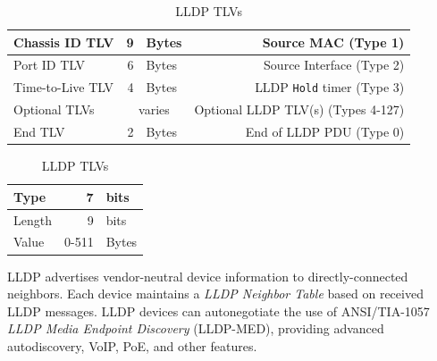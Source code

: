 \documentclass[12pt]{article}
\newcommand{\mc}[3]{\multicolumn{#1}{#2}{#3}}
\begin{document}
	\begin{table}[H]
	\begin{minipage}{.75\linewidth}
	\centering
	\caption{IEEE 802.1AB LLDP PDU Format \label{tab:802.1AB}}
	\begin{tabular}{| l | r @{ } l | r |}\hline
	Chassis ID TLV	& 9	& Bytes		& Source MAC (Type 1)\\\hline
	Port ID TLV		& 6	& Bytes		& Source Interface (Type 2)\\\hline
	Time-to-Live TLV	& 4	& Bytes		& LLDP \texttt{Hold} timer (Type 3)\\\hline
	Optional TLVs	& \mc{2}{c|}{varies}	& Optional LLDP TLV(s) (Types 4-127)\\\hline
	End TLV		& 2	& Bytes		& End of LLDP PDU (Type 0)\\\hline
	\end{tabular}\end{minipage}\hfill
	\begin{minipage}{.24\linewidth}
	\centering
	\caption{LLDP TLVs \label{tab:LLDP TLV}}
	\begin{tabular}{| l | r @{ } l |}\hline
	Type		& 7		& bits\\\hline
	Length	& 9		& bits\\\hline
	Value		& 0-511	& Bytes\\\hline
	\end{tabular}\end{minipage}\end{table}
	LLDP advertises vendor-neutral device information to directly-connected neighbors. Each device maintains a \textit{LLDP Neighbor Table} based on received LLDP messages. LLDP devices can autonegotiate the use of ANSI/TIA-1057 \textit{LLDP Media Endpoint Discovery} (LLDP-MED), providing advanced autodiscovery, VoIP, PoE, and other features.


\end{document}
